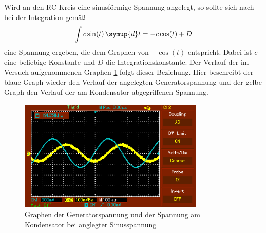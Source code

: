Wird an den RC-Kreis eine sinusförmige Spannung angelegt, so sollte sich nach bei der
Integration gemäß
\begin{equation}
  \int c\sin(t) \, \symup{d}t=-c\cos(t) + D
\end{equation}
eine Spannung ergeben, die dem Graphen von $-\cos(t)$ entspricht. Dabei ist $c$ eine
beliebige Konstante und $D$ die Integrationskonstante. Der Verlauf der
im Versuch aufgenommenen Graphen \ref{fig:sinus} folgt dieser Beziehung. Hier beschreibt der blaue Graph
wieder den Verlauf der angelegten Generatorspannung und der gelbe Graph den Verlauf der
am Kondensator abgegriffenen Spannung.
\begin{figure}
  \centering
  \includegraphics[width=250pt]{data/integration_sinus.PNG}
  \caption{Graphen der Generatorspannung und der Spannung am Kondensator bei anglegter
  Sinusspannung}
  \label{fig:sinus}
\end{figure}
